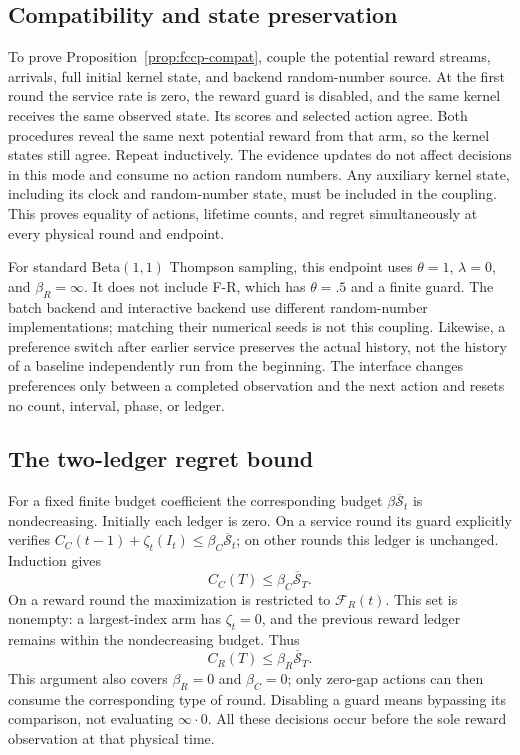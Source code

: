 \documentclass[11pt]{article}
\theoremstyle{remark}
\begin{document}
\subsection{Compatibility and state preservation}
To prove Proposition~\ref{prop:fccp-compat}, couple the potential reward
streams, arrivals, full initial kernel state, and backend random-number
source. At the first round the service rate is zero, the reward guard
is disabled, and the same kernel receives the same observed state.
Its scores and selected action agree. Both procedures reveal the same
next potential reward from that arm, so the kernel states still agree.
Repeat inductively. The evidence updates do not affect decisions in
this mode and consume no action random numbers. Any auxiliary kernel
state, including its clock and random-number state, must be included
in the coupling. This proves equality of actions, lifetime counts,
and regret simultaneously at every physical round and endpoint.

For standard Beta$(1,1)$ Thompson sampling, this endpoint uses
$\theta=1$, $\lambda=0$, and $\beta_R=\infty$. It does not include
F-R, which has $\theta=.5$ and a finite guard. The batch backend and
interactive backend use different random-number implementations;
matching their numerical seeds is not this coupling. Likewise, a
preference switch after earlier service preserves the actual history,
not the history of a baseline independently run from the beginning.
The interface changes preferences only between a completed observation
and the next action and resets no count, interval, phase, or ledger.

\subsection{The two-ledger regret bound}
For a fixed finite budget coefficient the corresponding budget
$\beta\overline{\mathcal S}_t$ is nondecreasing. Initially each ledger
is zero. On a service round its guard explicitly verifies
$C_C(t-1)+\zeta_t(I_t)\le\beta_C\overline{\mathcal S}_t$;
on other rounds this ledger is unchanged. Induction gives
\[
 C_C(T)\le\beta_C\overline{\mathcal S}_T.
\]
On a reward round the maximization is restricted to
$\mathcal F_R(t)$. This set is nonempty: a largest-index arm has
$\zeta_t=0$, and the previous reward ledger remains within the
nondecreasing budget. Thus
\[
 C_R(T)\le\beta_R\overline{\mathcal S}_T.
\]
This argument also covers $\beta_R=0$ and $\beta_C=0$; only zero-gap
actions can then consume the corresponding type of round. Disabling
a guard means bypassing its comparison, not evaluating
$\infty\cdot0$. All these decisions occur before the sole reward
observation at that physical time.
\end{document}
